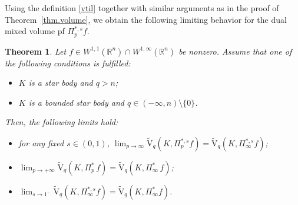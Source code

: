 \documentclass[11pt, reqno]{article}
\newtheorem{theorem}{Theorem}[section]
\theoremstyle{definition}
\numberwithin{equation}{section}
\newcommand{\R}{\mathbb{R}}
\newcommand{\vtil}{\widetilde{\mathrm{V}}}
\begin{document}
Using the definition \ref{vtil} together with similar arguments as in the proof of Theorem~\ref{thm.volume}, we obtain the following limiting behavior for the dual mixed volume pf $\Pi^{\ast, s}_p f$. 

\begin{theorem}\label{thm.mixed}
    Let $f \in W^{1, 1}(\R^n) \cap W^{1, \infty}(\R^n)$ be nonzero.
	Assume that one of the following conditions is fulfilled:
	\begin{itemize}
		\item[(a)] $K$ is a star body and $q > n$;
		
		\item[(b)] $K$ is a bounded star body and $q \in (- \infty, n) \setminus \{ 0 \}$.
    \end{itemize}
    Then, the following limits hold:
    \begin{itemize}
        \item[(i)] for any fixed $s \in (0, 1)$, $\textstyle\lim_{p \to \infty} \vtil_{q}(K, \Pi^{\ast, s}_p f) = \vtil_{q}(K, \Pi^{\ast, s}_\infty  f)$;
        
        \item[(ii)] $\textstyle\lim_{p \to + \infty} \vtil_{q}(K, \Pi^{\ast}_p \, f) = \vtil_{q}(K, \Pi^{\ast}_\infty \, f)$;
        
        \item[(iii)]  $\textstyle\lim_{s \to 1^-} \vtil_{q}(K, \Pi^{\ast, s}_\infty  f) = \vtil_{q}(K, \Pi^{\ast}_\infty f)$.
    \end{itemize}
\end{theorem}
\end{document}
